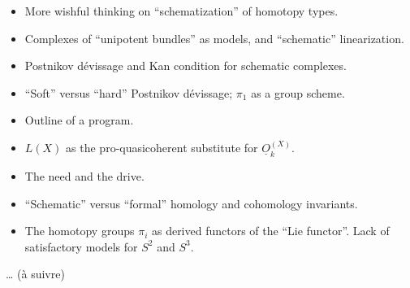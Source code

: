 \documentclass[11pt,a4paper]{article}
\begin{document}
\begin{itemize}
  \item[(110.)] More wishful thinking on ``schematization'' of homotopy types.
  \item[(111.)] Complexes of ``unipotent bundles'' as models, and ``schematic'' linearization.
  \item[112.] Postnikov dévissage and Kan condition for schematic complexes.
  \item[113.] ``Soft'' versus ``hard'' Postnikov dévissage; $\pi_{1}$ as a group scheme.
  \item[114.] Outline of a program.
  \item[115.] $L(X)$ as the pro-quasicoherent substitute for $\underline{O}_{k}^{(X)}$.
  \item[116.] The need and the drive.
  \item[117.] ``Schematic'' versus ``formal'' homology and cohomology invariants.
  \item[(118.)] The homotopy groups $\pi_{i}$ as derived functors of the ``Lie functor''. Lack of satisfactory models for $S^{2}$ and $S^{3}$.
\end{itemize}
… (à suivre)
\end{document}
